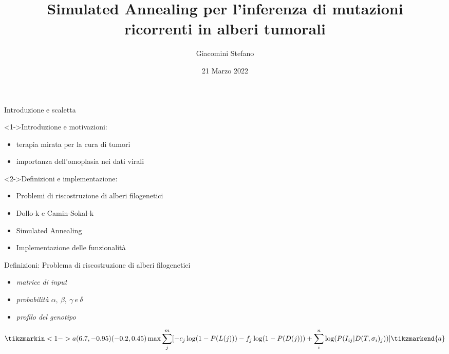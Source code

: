 \documentclass{beamer}
\author{Giacomini Stefano}
\title{Simulated Annealing per l'inferenza di mutazioni\\ ricorrenti in alberi tumorali}
\date{21 Marzo 2022}
\begin{document}
\titlepageframe

\begin{tframe}{Introduzione e scaletta}
  \begin{block}<1->{Introduzione e motivazioni:}
    \begin{itemize}
      \item terapia mirata per la cura di tumori
      \item importanza dell'omoplasia nei dati virali
    \end{itemize}
  \end{block}
  \begin{block}<2->{{Definizioni e implementazione:}}
    \begin{itemize}
      \item Problemi di riscostruzione di alberi filogenetici
      \item Dollo-k e Camin-Sokal-k
      \item Simulated Annealing
      \item Implementazione delle funzionalità
    \end{itemize}
  \end{block}
\end{tframe}

\begin{tframe}{Definizioni: Problema di riscostruzione di alberi filogenetici}
    \vspace{5mm}
    \begin{itemize}
      \item \textit{matrice di input}
      \item \textit{probabilità $\alpha,\ \beta,\ \gamma\ e\ \delta$}
      \item \textit{profilo del genotipo}
    \end{itemize}

    \vspace{10mm}
    \tiny
    \begin{equation*}
      \tikzmarkin<1->{a}(6.7,-0.95)(-0.2,0.45)
        \max{\sum_{j}^{m}[-c_{j}\log(1-P(L(j)))-f_{j}\log(1-P(D(j)))+\sum_{i}^{n}\log(P(I_{ij}|D(T, \sigma_{i})_{j}))]}
      \tikzmarkend{a}
    \end{equation*}
\end{tframe}
\end{document}
